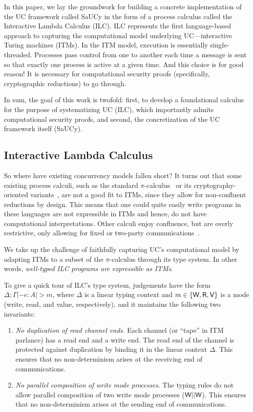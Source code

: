 In this paper, we lay the groundwork for building a concrete implementation of
the UC framework called SaUCy in the form of a process calculus called the
Interactive Lambda Calculus (ILC). ILC represents the first language-based
approach to capturing the computational model underlying UC---interactive Turing
machines (ITMs). In the ITM model, execution is essentially
single-threaded. Processes pass control from one to another each time a message
is sent so that exactly one process is active at a given time. And this choice
is for good reason! It is necessary for computational security proofs
(specifically, cryptographic reductions) to go through.

In sum, the goal of this work is twofold: first, to develop a foundational
calculus for the purpose of systematizing UC (ILC), which importantly admits
computational security proofs, and second, the concretization of the UC
framework itself (SaUCy).

\subsection{Interactive Lambda Calculus}

So where have existing concurrency models fallen short?  It turns out that some
existing process calculi, such as the standard
$\pi$-calculus~\cite{milner1999communicating} or its cryptography-oriented
variants~\cite{abadi1999calculus, abadi2001mobile}, are not a good fit to ITMs,
since they allow for non-confluent reductions by design. This means that one
could quite easily write programs in these languages are not expressible in ITMs
and hence, do not have computational interpretations. Other calculi enjoy
confluence, but are overly restrictive, only allowing for fixed or two-party
communications~\cite{kobayashi1999linearity,bohl2016symbolic,fowler2018session}.

We take up the challenge of faithfully capturing UC's computational model by
adapting ITMs to a subset of the $\pi$-calculus through its type system. In other
words, \emph{well-typed ILC programs are expressible as ITMs}.

To give a quick tour of ILC's type system, judgements have the form $\Delta ; \Gamma |- e
: A |> m$, where $\Delta$ is a linear typing context and $m \in \{\textsf{W}, \textsf{R}, \textsf{V}\}$ is a
mode (write, read, and value, respectively), and it maintains the following two
invariants:

\begin{enumerate}[leftmargin=*]
\item \emph{No duplication of read channel ends.} Each channel (or ``tape'' in
  ITM parlance) has a read end and a write end. The read end of the channel is
  protected against duplication by binding it in the linear context $\Delta$. This
  ensures that no non-determinism arises at the receiving end of communications.

\item \emph{No parallel composition of write mode processes.} The typing rules
  do not allow parallel composition of two write mode processes ($\textsf{W} ||
  \textsf{W}$). This ensures that no non-determinism arises at the sending end of
  communications.
\end{enumerate}


